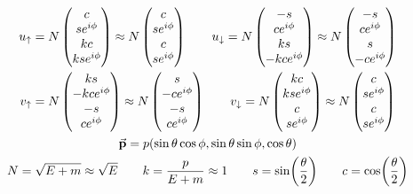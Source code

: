 \begin{gather*}
        u_\uparrow = N \begin{pmatrix}
                c\\se^{i\phi}\\kc\\kse^{i\phi}
        \end{pmatrix}
        \approx N \begin{pmatrix}
                c\\se^{i\phi}\\c\\se^{i\phi}
        \end{pmatrix}\qquad
        u_\downarrow = N \begin{pmatrix}
                -s\\ce^{i\phi}\\ks\\-kce^{i\phi}
        \end{pmatrix}
        \approx N \begin{pmatrix}
                -s\\ce^{i\phi}\\s\\-ce^{i\phi}
        \end{pmatrix}
        \\
        v_\uparrow = N \begin{pmatrix}
                ks\\-kce^{i\phi}\\-s\\ce^{i\phi}
        \end{pmatrix}
        \approx N \begin{pmatrix}
                s\\-ce^{i\phi}\\-s\\ce^{i\phi}
        \end{pmatrix}\qquad
        v_\downarrow = N \begin{pmatrix}
                kc\\kse^{i\phi}\\c\\se^{i\phi}
        \end{pmatrix}
        \approx N \begin{pmatrix}
                c\\se^{i\phi}\\c\\se^{i\phi}
        \end{pmatrix}
        \\
        \va{p} = p\qty(\sin\theta\cos\phi , \sin\theta\sin\phi , \cos\theta)
        \\
        N = \sqrt{E+m} \approx \sqrt{E}
        \qquad
        k = \frac{p}{E+m} \approx 1
        \qquad
        s = \sin(\frac{\theta}{2})
        \qquad
        c = \cos(\frac{\theta}{2})
\end{gather*}
